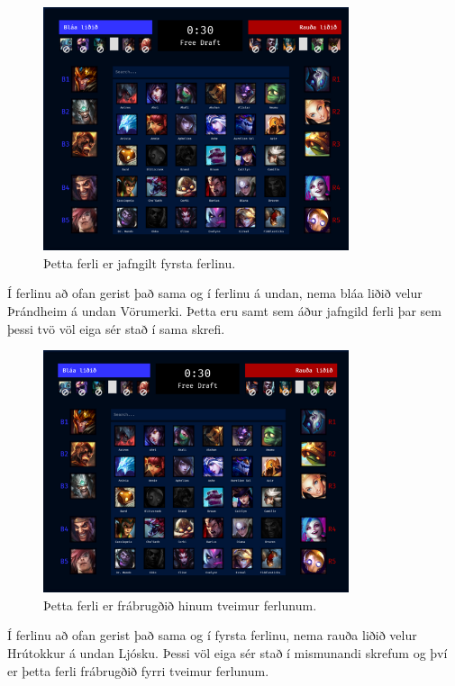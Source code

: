 \begin{figure}[h!]
  \centering
    \includegraphics[width=0.8\textwidth]{equivalent_draft.png}
  \caption{Þetta ferli er jafngilt fyrsta ferlinu.}
\end{figure}

Í ferlinu að ofan gerist það sama og í ferlinu á undan, nema bláa liðið velur Þrándheim á undan Vörumerki.
Þetta eru samt sem áður jafngild ferli þar sem þessi tvö völ eiga sér stað í sama skrefi.

\begin{figure}[h!]
  \centering
    \includegraphics[width=0.8\textwidth]{different_draft.png}
  \caption{Þetta ferli er frábrugðið hinum tveimur ferlunum.}
\end{figure}

Í ferlinu að ofan gerist það sama og í fyrsta ferlinu, nema rauða liðið velur Hrútokkur á undan Ljósku.
Þessi völ eiga sér stað í mismunandi skrefum og því er þetta ferli frábrugðið fyrri tveimur ferlunum.


